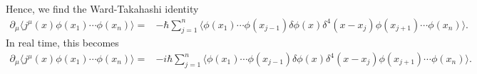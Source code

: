\begin{enumerate}[label=\alph*)]
\begin{solution}
        Hence, we find the Ward-Takahashi identity
        \begin{align}
        \partial_\mu
        \langle j^\mu(x)\phi(x_1)\cdots\phi(x_n)\rangle
        ={}&
        -\hbar\sum_{j=1}^{n}
        \bigl\langle
            \phi(x_1)\cdots\phi(x_{j-1})
            \delta\phi(x)\delta^4(x-x_j)
            \phi(x_{j+1})\cdots\phi(x_n)
        \bigr\rangle.
        \end{align}
        In real time, this becomes
                \begin{align}
        \partial_\mu
        \langle j^\mu(x)\phi(x_1)\cdots\phi(x_n)\rangle
        ={}&
        -i\hbar\sum_{j=1}^{n}
        \bigl\langle
            \phi(x_1)\cdots\phi(x_{j-1})
            \delta\phi(x)\delta^4(x-x_j)
            \phi(x_{j+1})\cdots\phi(x_n)
        \bigr\rangle.
        \end{align}
    \end{solution}


\end{enumerate}

